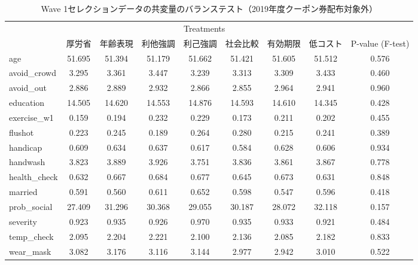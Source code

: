 \documentclass[
  11pt,
  a4paper,
]{article}
\begin{document}
\begin{table}

\caption{\label{tab:BalanceWave2Coupon0}Wave 1セレクションデータの共変量のバランステスト（2019年度クーポン券配布対象外）}
\centering
\fontsize{9}{11}\selectfont
\begin{tabular}[t]{lcccccccc}
\toprule
\multicolumn{1}{c}{ } & \multicolumn{7}{c}{Treatments} & \multicolumn{1}{c}{ } \\
\cmidrule(l{3pt}r{3pt}){2-8}
  & 厚労省 & 年齢表現 & 利他強調 & 利己強調 & 社会比較 & 有効期限 & 低コスト & P-value (F-test)\\
\midrule
age & 51.695 & 51.394 & 51.179 & 51.662 & 51.421 & 51.605 & 51.512 & 0.576\\
avoid\_crowd & 3.295 & 3.361 & 3.447 & 3.239 & 3.313 & 3.309 & 3.433 & 0.460\\
avoid\_out & 2.886 & 2.889 & 2.932 & 2.866 & 2.855 & 2.964 & 2.941 & 0.960\\
education & 14.505 & 14.620 & 14.553 & 14.876 & 14.593 & 14.610 & 14.345 & 0.428\\
exercise\_w1 & 0.159 & 0.194 & 0.232 & 0.229 & 0.173 & 0.211 & 0.202 & 0.455\\
flushot & 0.223 & 0.245 & 0.189 & 0.264 & 0.280 & 0.215 & 0.241 & 0.389\\
handicap & 0.609 & 0.634 & 0.637 & 0.617 & 0.584 & 0.628 & 0.606 & 0.934\\
handwash & 3.823 & 3.889 & 3.926 & 3.751 & 3.836 & 3.861 & 3.867 & 0.778\\
health\_check & 0.632 & 0.667 & 0.684 & 0.677 & 0.645 & 0.673 & 0.631 & 0.848\\
married & 0.591 & 0.560 & 0.611 & 0.652 & 0.598 & 0.547 & 0.596 & 0.418\\
prob\_social & 27.409 & 31.296 & 30.368 & 29.055 & 30.187 & 28.072 & 32.118 & 0.157\\
severity & 0.923 & 0.935 & 0.926 & 0.970 & 0.935 & 0.933 & 0.921 & 0.484\\
temp\_check & 2.095 & 2.204 & 2.221 & 2.100 & 2.136 & 2.085 & 2.182 & 0.833\\
wear\_mask & 3.082 & 3.176 & 3.116 & 3.144 & 2.977 & 2.942 & 3.010 & 0.522\\
\bottomrule
\end{tabular}
\end{table}
\end{document}
